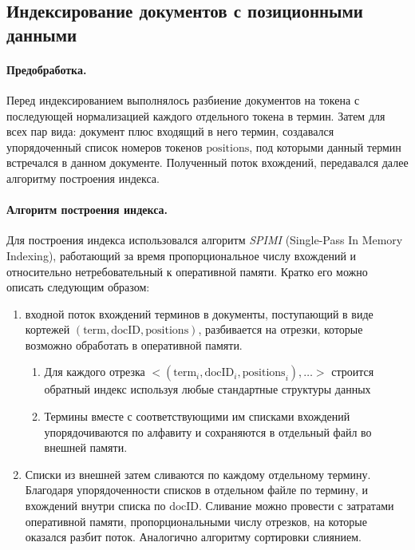 \documentclass[12pt]{article}
\begin{document}
\subsection{Индексирование документов с позиционными данными}
\paragraph{Предобработка.} Перед индексированием выполнялось разбиение документов на токена 
с последующей нормализацией каждого отдельного токена в термин. 
Затем для всех пар вида: документ плюс входящий в него термин, создавался упорядоченный 
список номеров токенов $\mathrm{positions}$, под которыми данный термин встречался в данном документе.
Полученный поток вхождений, передавался далее алгоритму построения индекса.

\paragraph{Алгоритм построения индекса.}
Для построения индекса использовался алгоритм \emph{SPIMI} 
(Single-Pass In Memory Indexing), работающий за время пропорциональное числу вхождений
и относительно нетребовательный к оперативной памяти.
Кратко его можно описать следующим образом:
\begin{enumerate}
\item входной поток вхождений терминов в документы, поступающий в виде кортежей
 $(\mathrm{term}, \mathrm{docID}, \mathrm{positions})$, разбивается на отрезки, 
которые возможно обработать в оперативной памяти.
    \begin{enumerate}
        \item Для каждого отрезка $<(\mathrm{term}_i, \mathrm{docID}_i, \mathrm{positions}_i), \ldots >$
            строится обратный индекс используя любые стандартные структуры данных
        \item Термины вместе с соответствующими им списками вхождений
            упорядочиваются по алфавиту и сохраняются в отдельный файл во внешней памяти.
    \end{enumerate}
\item Списки из внешней затем сливаются по каждому отдельному термину.
Благодаря упорядоченности списков в отдельном файле по термину, и вхождений внутри 
списка по $\mathrm{docID}$. Сливание можно провести с затратами оперативной памяти, пропорциональными
числу отрезков, на которые оказался разбит поток. Аналогично алгоритму сортировки слиянием.
\end{enumerate}
\end{document}
